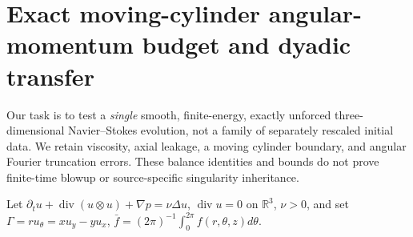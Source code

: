 
\section{Exact moving-cylinder angular-momentum budget and dyadic transfer}
\label{sec:xxxix-moving}
Our task is to test a \emph{single} smooth, finite-energy, exactly
unforced three-dimensional Navier--Stokes evolution, not a family
of separately rescaled initial data. We retain viscosity, axial
leakage, a moving cylinder boundary, and angular Fourier truncation
errors. These balance identities and bounds do not prove finite-time
blowup or source-specific singularity inheritance.

Let $\partial_tu+\operatorname{div}(u\otimes u)+\nabla p
=\nu\Delta u$, $\operatorname{div}u=0$ on $\mathbb R^3$,
$\nu>0$, and set
$\Gamma=ru_\theta=xu_y-yu_x$,
$\bar f=(2\pi)^{-1}\int_0^{2\pi}f(r,\theta,z)d\theta$.

